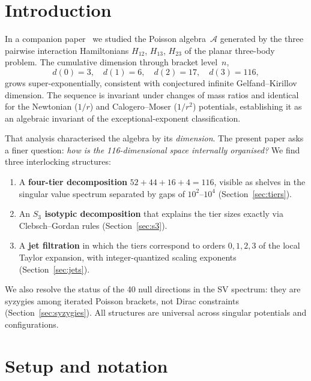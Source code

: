 \documentclass[11pt,a4paper]{article}
\theoremstyle{remark}
\newcommand{\cA}{\mathcal{A}}
\newcommand{\SG}{S_3}
\begin{document}
\section{Introduction}

In a companion paper~\cite{paper1} we studied the Poisson
algebra~$\cA$ generated by the three pairwise interaction
Hamiltonians $H_{12}$, $H_{13}$, $H_{23}$ of the planar
three-body problem.  The cumulative dimension through
bracket level~$n$,
\[
  d(0) = 3,\quad d(1) = 6,\quad d(2) = 17,\quad d(3) = 116,
\]
grows super-exponentially, consistent with conjectured
infinite Gelfand--Kirillov dimension.  The sequence is invariant
under changes of mass ratios and identical for the
Newtonian ($1/r$) and Calogero--Moser ($1/r^2$) potentials,
establishing it as an algebraic invariant of the
exceptional-exponent classification.

That analysis characterised the algebra by its
\emph{dimension}.  The present paper asks a finer question:
\emph{how is the 116-dimensional space internally
organised?}  We find three interlocking structures:

\begin{enumerate}[nosep]
  \item A \textbf{four-tier decomposition}
    $52 + 44 + 16 + 4 = 116$, visible as shelves in the
    singular value spectrum separated by gaps of
    $10^{2}$--$10^{4}$ (Section~\ref{sec:tiers}).
  \item An \textbf{$\SG$ isotypic decomposition} that
    explains the tier sizes exactly via Clebsch--Gordan
    rules (Section~\ref{sec:s3}).
  \item A \textbf{jet filtration} in which the tiers
    correspond to orders $0,1,2,3$ of the local Taylor
    expansion, with integer-quantized scaling exponents
    (Section~\ref{sec:jets}).
\end{enumerate}

We also resolve the status of the 40 null directions in
the SV spectrum: they are syzygies among iterated Poisson
brackets, not Dirac constraints
(Section~\ref{sec:syzygies}).  All structures are
universal across singular potentials and configurations.


\section{Setup and notation}
\label{sec:setup}
\end{document}
